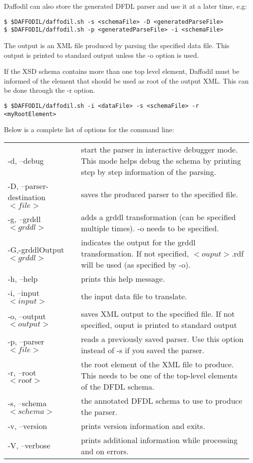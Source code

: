 \documentclass[a4paper,10pt]{article}
\begin{document}
Daffodil can also store the generated DFDL parser and use it at a later time, e.g:

\begin{verbatim}
$ $DAFFODIL/daffodil.sh -s <schemaFile> -D <generatedParseFile>
$ $DAFFODIL/daffodil.sh -p <generatedParseFile> -i <schemaFile>
\end{verbatim}

The output is an XML file produced by parsing the specified data file. This output is printed to standard output unless the -o option is used. 


If the XSD schema contains more than one top level element, Daffodil must be informed of the element that should be used as root of the output XML. This can be done through the -r option.

\begin{verbatim}
$ $DAFFODIL/daffodil.sh -i <dataFile> -s <schemaFile> -r <myRootElement>
\end{verbatim}

Below is a complete list of options for the command line:

\begin{tabular}{l|p{3in}}
 -d, --debug & start the parser in interactive debugger mode. This mode helps debug the schema by printing step by step information of the parsing. \\
-D, --parser-destination $<file>$ & saves the produced parser to the specified file. \\
-g, --grddl $<grddl>$ & adds a grddl transformation (can be specified multiple times). -o needs to be specified.\\
-G,-grddlOutput $<grddl>$ & indicates the output for the grddl transformation. If not specified, $<ouput>$.rdf will be used (as specified by -o).\\
-h, --help & prints this help message. \\
-i, --input $<input>$ & the input data file to translate. \\
-o, --output $<output>$ & saves XML output to the specified file. If not specified, ouput is printed to standard output \\
-p, --parser $<file>$ & reads a previously saved parser. Use this option instead of -s if you saved the parser.\\
-r, --root $<root>$ & the root element of the XML file to produce. This needs to be one of the top-level elements of the DFDL schema.\\
-s, --schema $<schema>$ & the annotated DFDL schema to use to produce the parser.\\
-v, --version &  prints version information and exits. \\
-V, --verbose &  prints additional information while processing and on errors. \\
\end{tabular}
\end{document}
